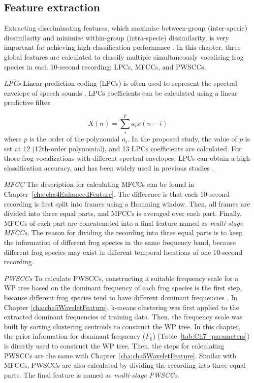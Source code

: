 \subsection{Feature extraction}
Extracting discriminating features, which maximise between-group (inter-specie) dissimilarity
and minimise within-group (intra-specie) dissimilarity, is very important for achieving high classification performance \citep{huang2009frog, bedoya2014automatic}. In this chapter, three global features are calculated to classify multiple simultaneously vocalising frog species in each 10-second recording: LPCs, MFCCs, and PWSCCs. 





\textit{LPCs}
Linear prediction coding (LPCs) is often used to represent the spectral envelope of speech sounds \citep{itakura1975line}. LPCs coefficients can be calculated using a linear predictive filter.

\begin{equation}
X(n) = \sum_{i}^{p}a_{i}x(n-i)
\end{equation}
where $p$ is the order of the polynomial $a_{i}$. In the proposed study, the value of $p$ is set at 12 (12th-order polynomial), and 13 LPCs coefficients are calculated. For those frog vocalizations with different spectral envelopes, LPCs can obtain a high classification accuracy, and has been widely used in previous studies \cite{yuan2012frog, jaafarcomparative, jaafar2015effect}.

\textit{MFCC}
The description for calculating MFCCs can be found in Chapter~\ref{cha:cha4EnhancedFeature}. The difference is that each 10-second recording is first split into frames using a Hamming window. Then, all frames are divided into three equal parts, and MFCCs is averaged over each part. Finally, MFCCs of each part are concatenated into a final feature named as \textit{multi-stage MFCCs}. The reason for dividing the recording into three equal parts is to keep the information of different frog species in the same frequency band, 
because different frog species may exist in different temporal locations of one 10-second recording. 


\textit{PWSCCs}
To calculate PWSCCs, constructing a suitable frequency scale for a WP tree based on the dominant frequency of each frog species is the first step, because different frog species tend to have different dominant frequencies \citep{Gingras2013}. In Chapter \ref{cha:cha5WaveletFeature}, k-means clustering was first applied to the extracted dominant frequencies of training data. Then, the frequency scale was built by sorting clustering centroids to construct the WP tree. In this chapter, the prior information for dominant frequency ($F_{0}$) (Table~\ref{tab:Ch7_parameters}) is directly used to construct the WP tree. Then, the steps for calculating PWSCCs are the same with Chapter~\ref{cha:cha5WaveletFeature}. Similar with MFCCs, PWSCCs are also calculated by dividing the recording into three equal parts. The final feature is named as \textit{multi-stage PWSCCs}.


